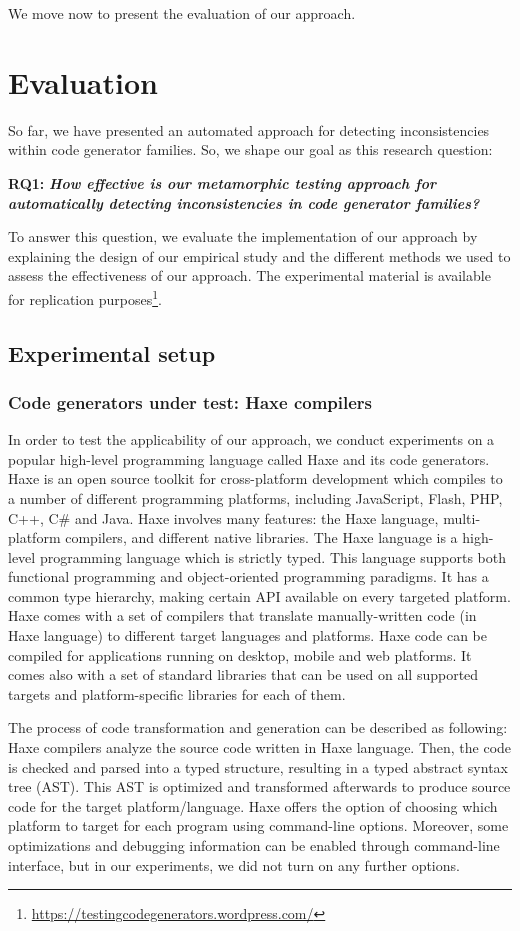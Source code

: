 We move now to present the evaluation of our approach.


\section{Evaluation}
\label{sec:cg_evaluation}
So far, we have presented an automated approach for detecting inconsistencies within code generator families. So, we shape our goal as this research question:

\textbf{RQ1: } 
\textbf{\textit{How effective is our metamorphic testing approach for automatically detecting inconsistencies in code generator families?}} 

To answer this question, we evaluate the implementation of our approach by explaining the design of our empirical study and the different methods we used to assess the effectiveness of our approach. 
The experimental material is available for replication purposes\footnote{\url{https://testingcodegenerators.wordpress.com/}}.
\subsection{Experimental setup}
\subsubsection{Code generators under test: Haxe compilers}
In order to test the applicability of our approach, we conduct experiments on a popular high-level programming language called Haxe and its code generators. Haxe is an open source toolkit for cross-platform development which compiles to a number of different programming platforms, including JavaScript, Flash, PHP, C++, C\# and Java. Haxe involves many features: the Haxe language, multi-platform compilers, and different native libraries. 
The Haxe language is a high-level programming language which is strictly typed. This language supports both functional programming and object-oriented programming paradigms. It has a common type hierarchy, making certain API available on every targeted platform.
Haxe comes with a set of compilers that translate manually-written code (in Haxe language) to different target languages and platforms. 
Haxe code can be compiled for applications running on desktop, mobile and web platforms. It comes also with a set of standard libraries that can be used on all supported targets and platform-specific libraries for each of them.

The process of code transformation and generation can be described as following: Haxe compilers analyze the source code written in Haxe language. Then, the code is checked and parsed into a typed structure, resulting in a typed abstract syntax tree (AST). This AST is optimized and transformed afterwards to produce source code for the target platform/language.
Haxe offers the option of choosing which platform to target for each program using command-line options. Moreover, some optimizations and debugging information can be enabled through command-line interface, but in our experiments, we did not turn on any further options. 

